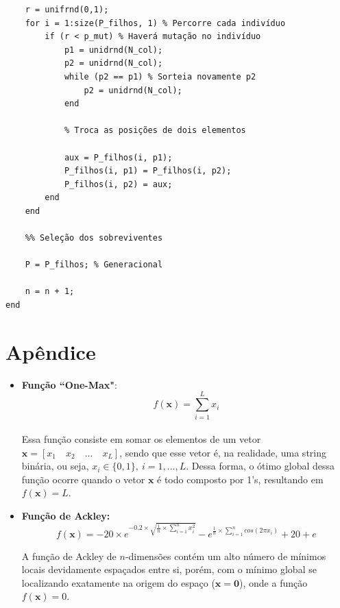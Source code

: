 \documentclass{report}
\begin{document}
\begin{lstlisting}
    r = unifrnd(0,1);
    for i = 1:size(P_filhos, 1) % Percorre cada indivíduo
        if (r < p_mut) % Haverá mutação no indivíduo
            p1 = unidrnd(N_col);
            p2 = unidrnd(N_col);
            while (p2 == p1) % Sorteia novamente p2
                p2 = unidrnd(N_col);
            end
    
            % Troca as posições de dois elementos

            aux = P_filhos(i, p1); 
            P_filhos(i, p1) = P_filhos(i, p2);
            P_filhos(i, p2) = aux;
        end
    end

    %% Seleção dos sobreviventes

    P = P_filhos; % Generacional
             
    n = n + 1;
end

	\end{lstlisting}

	\section*{Apêndice}
	
	\begin{itemize}
		\item \textbf{Função ``One-Max"}:\\
		
		\begin{equation*}
		f(\mathbf{x}) = \sum_{i = 1}^{L} x_i
		\end{equation*}\\
		
		Essa função consiste em somar os elementos de um vetor $\mathbf{x} = [x_1 \quad x_2 \quad ... \quad x_L]$, sendo que esse vetor é, na realidade, uma string binária, ou seja, $x_i \in \{0, 1 \},\ i = 1, ..., L$. Dessa forma, o ótimo global dessa função ocorre quando o vetor $\mathbf{x}$ é todo composto por 1's, resultando em $f(\mathbf{x}) = L$.\\		
		
		\item \textbf{Função de Ackley:}\\
		
		\begin{equation*}
		f(\mathbf{x}) = -20 \times e^{-0.2 \times \sqrt{\frac{1}{n} \times \sum_{i = 1}^{n} x_i^2}} - e^{\frac{1}{n} \times \sum_{i = 1}^{n} cos(2\pi x_i)} + 20 + e
		\end{equation*}
		
		A função de Ackley de $n$-dimensões contém um alto número de mínimos locais devidamente espaçados entre si, porém, com o mínimo global se localizando exatamente na origem do espaço ($\mathbf{x} = \boldsymbol{0}$), onde a função $f(\mathbf{x}) = 0$.
		
	\end{itemize}
\end{document}

